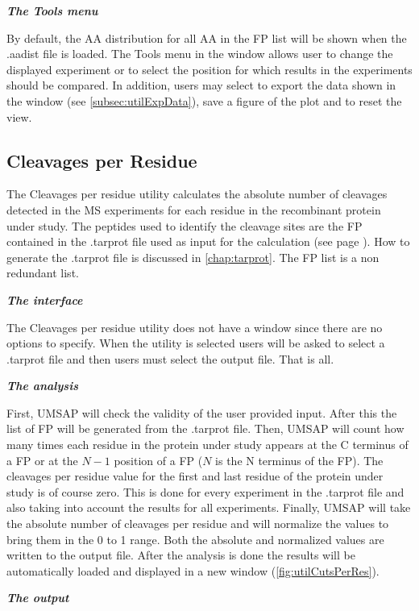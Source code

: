 \textit{\textbf{The Tools menu}}

By default, the AA distribution for all AA in the FP list will be shown when the .aadist file is loaded. The Tools menu in the window allows user to change the displayed experiment or to select the position for which results in the experiments should be compared. In addition, users may select to export the data shown in the window (see \autoref{subsec:utilExpData}), save a figure of the plot and to reset the view. 

\subsection{Cleavages per Residue}
\label{subsec:utilCutsPerRes}
The Cleavages per residue utility calculates the absolute number of cleavages detected in the MS experiments for each residue in the recombinant protein under study. The peptides used to identify the cleavage sites are the FP contained in the .tarprot file used as input for the calculation (see page \pageref{par:tarprotPIP}). How to generate the .tarprot file is discussed in \autoref{chap:tarprot}. The FP list is a non redundant list.

\textit{\textbf{The interface}}

The Cleavages per residue utility does not have a window since there are no options to specify. When the utility is selected users will be asked to select a .tarprot file and then users must select the output file. That is all.

\textit{\textbf{The analysis}}

First, UMSAP will check the validity of the user provided input. After this the list of FP will be generated from the .tarprot file. Then, UMSAP will count how many times each residue in the protein under study appears at the C terminus of a FP or at the \(N-1\) position of a FP (\(N\) is the N terminus of the FP). The cleavages per residue value for the first and last residue of the protein under study is of course zero. This is done for every experiment in the .tarprot file and also taking into account the results for all experiments. Finally, UMSAP will take the absolute number of cleavages per residue and will normalize the values to bring them in the 0 to 1 range. Both the absolute and normalized values are written to the output file. After the analysis is done the results will be automatically loaded and displayed in a new window (\autoref{fig:utilCutsPerRes}). 

\textit{\textbf{The output}}

